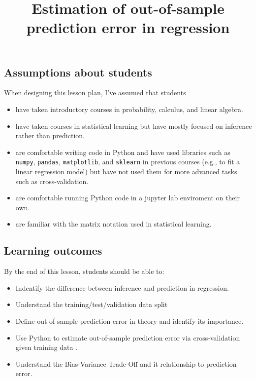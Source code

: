 \documentclass[
  letterpaper,
  DIV=11,
  numbers=noendperiod]{scrartcl}
\title{Estimation of out-of-sample prediction error in regression}
\author{}
\date{}
\providecommand{\tightlist}{%
  \setlength{\itemsep}{0pt}\setlength{\parskip}{0pt}}\usepackage{longtable,booktabs,array}
\begin{document}
\maketitle


\subsection{Assumptions about
students}\label{assumptions-about-students}

When designing this lesson plan, I've assumed that students

\begin{itemize}
\tightlist
\item
  have taken introductory courses in probability, calculus, and linear
  algebra.
\item
  have taken courses in statistical learning but have mostly focused on
  inference rather than prediction.\\
\item
  are comfortable writing code in Python and have used libraries such as
  \texttt{numpy}, \texttt{pandas}, \texttt{matplotlib}, and
  \texttt{sklearn} in previous courses (e.g., to fit a linear regression
  model) but have not used them for more advanced tasks such as
  cross-validation.
\item
  are comfortable running Python code in a jupyter lab enviroment on
  their own.
\item
  are familiar with the matrix notation used in statistical learning.
\end{itemize}

\subsection{Learning outcomes}\label{learning-outcomes}

By the end of this lesson, students should be able to:

\begin{itemize}
\tightlist
\item
  Indentify the difference between inference and prediction in
  regression.\\
\item
  Understand the training/test/validation data split
\item
  Define out-of-sample prediction error in theory and identify its
  importance.\\
\item
  Use Python to estimate out-of-sample prediction error via
  cross-validation given training data .\\
\item
  Understand the Bias-Variance Trade-Off and it relationship to
  prediction error.
\end{itemize}
\end{document}
